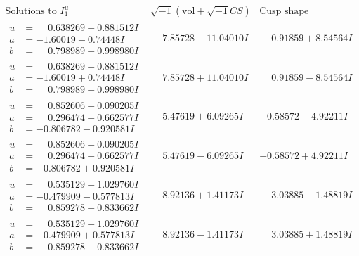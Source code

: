 \documentclass[1p]{elsarticle_modified}
\theoremstyle{definition}
\newcommand{\I}{\sqrt{-1}}
\begin{document}
$$\begin{array}{c|c|c}  
\text{Solutions to }I^u_{1}& \I (\text{vol} + \sqrt{-1}CS) & \text{Cusp shape}\\
 \hline 
\begin{aligned}
u &= \phantom{-}0.638269 + 0.881512 I \\
a &= -1.60019 - 0.74448 I \\
b &= \phantom{-}0.798989 - 0.998980 I\end{aligned}
 & \phantom{-}7.85728 - 11.04010 I & \phantom{-}0.91859 + 8.54564 I \\ \hline\begin{aligned}
u &= \phantom{-}0.638269 - 0.881512 I \\
a &= -1.60019 + 0.74448 I \\
b &= \phantom{-}0.798989 + 0.998980 I\end{aligned}
 & \phantom{-}7.85728 + 11.04010 I & \phantom{-}0.91859 - 8.54564 I \\ \hline\begin{aligned}
u &= \phantom{-}0.852606 + 0.090205 I \\
a &= \phantom{-}0.296474 - 0.662577 I \\
b &= -0.806782 - 0.920581 I\end{aligned}
 & \phantom{-}5.47619 + 6.09265 I & -0.58572 - 4.92211 I \\ \hline\begin{aligned}
u &= \phantom{-}0.852606 - 0.090205 I \\
a &= \phantom{-}0.296474 + 0.662577 I \\
b &= -0.806782 + 0.920581 I\end{aligned}
 & \phantom{-}5.47619 - 6.09265 I & -0.58572 + 4.92211 I \\ \hline\begin{aligned}
u &= \phantom{-}0.535129 + 1.029760 I \\
a &= -0.479909 - 0.577813 I \\
b &= \phantom{-}0.859278 + 0.833662 I\end{aligned}
 & \phantom{-}8.92136 + 1.41173 I & \phantom{-}3.03885 - 1.48819 I \\ \hline\begin{aligned}
u &= \phantom{-}0.535129 - 1.029760 I \\
a &= -0.479909 + 0.577813 I \\
b &= \phantom{-}0.859278 - 0.833662 I\end{aligned}
 & \phantom{-}8.92136 - 1.41173 I & \phantom{-}3.03885 + 1.48819 I \\ \hline\begin{aligned}

\end{aligned}
\end{array}$$
\end{document}
